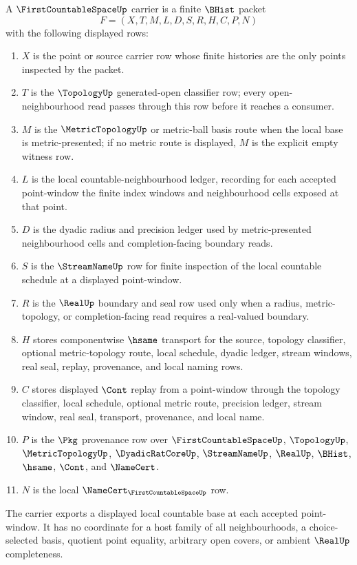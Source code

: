 \begin{definition}
\label{def:first-countable-space-carrier}
A $\FirstCountableSpaceUp$ carrier is a finite $\BHist$ packet
$$
F=(X,T,M,L,D,S,R,H,C,P,N)
$$
with the following displayed rows:
\begin{enumerate}
\item $X$ is the point or source carrier row whose finite histories are the only points inspected by the packet.
\item $T$ is the $\TopologyUp$ generated-open classifier row; every open-neighbourhood read passes through this row before it reaches a consumer.
\item $M$ is the $\MetricTopologyUp$ or metric-ball basis route when the local base is metric-presented; if no metric route is displayed, $M$ is the explicit empty witness row.
\item $L$ is the local countable-neighbourhood ledger, recording for each accepted point-window the finite index windows and neighbourhood cells exposed at that point.
\item $D$ is the dyadic radius and precision ledger used by metric-presented neighbourhood cells and completion-facing boundary reads.
\item $S$ is the $\StreamNameUp$ row for finite inspection of the local countable schedule at a displayed point-window.
\item $R$ is the $\RealUp$ boundary and seal row used only when a radius, metric-topology, or completion-facing read requires a real-valued boundary.
\item $H$ stores componentwise $\hsame$ transport for the source, topology classifier, optional metric-topology route, local schedule, dyadic ledger, stream windows, real seal, replay, provenance, and local naming rows.
\item $C$ stores displayed $\Cont$ replay from a point-window through the topology classifier, local schedule, optional metric route, precision ledger, stream window, real seal, transport, provenance, and local name.
\item $P$ is the $\Pkg$ provenance row over $\FirstCountableSpaceUp$, $\TopologyUp$, $\MetricTopologyUp$, $\DyadicRatCoreUp$, $\StreamNameUp$, $\RealUp$, $\BHist$, $\hsame$, $\Cont$, and $\NameCert$.
\item $N$ is the local $\NameCert_{\FirstCountableSpaceUp}$ row.
\end{enumerate}
The carrier exports a displayed local countable base at each accepted point-window. It has no coordinate for a host family of all neighbourhoods, a choice-selected basis, quotient point equality, arbitrary open covers, or ambient $\RealUp$ completeness.
\end{definition}

